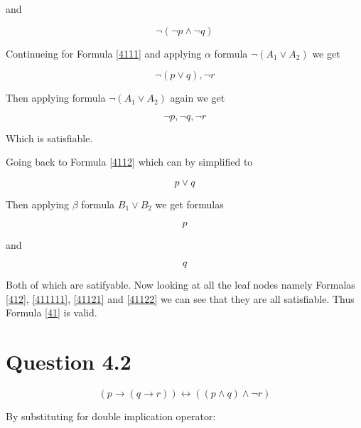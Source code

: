 \documentclass[10pt,a4paper]{article}
\begin{document}
 and 
 
 \begin{equation}
 \label{4112}
  \neg ( \neg p \wedge \neg q )
 \end{equation}


Continueing for Formula \ref{4111} and applying $\alpha$ formula $\neg ( A_1 \vee A_2 )$ we get

\begin{equation}
\label{41111}
 \neg (p \vee q), \neg r 
\end{equation}

Then applying formula $\neg ( A_1 \vee A_2 )$ again we get

\begin{equation}
\label{411111}
 \neg p, \neg q, \neg r
\end{equation}

Which is satisfiable.

Going back to Formula \ref{4112} which can by simplified to 

\begin{equation}
 p \vee q
\end{equation}

Then applying $\beta$ formula $B_1 \vee B_2$ we get formulas

\begin{equation}
 \label{41121}
 p
\end{equation}

and 

\begin{equation}
\label{41122}
q
\end{equation}

Both of which are satifyable. Now looking at all the leaf nodes namely 
Formalas \ref{412}, \ref{411111}, \ref{41121} and \ref{41122} we can see that they are all satisfiable. Thus
Formula \ref{41} is valid.







\section{Question 4.2}

\begin{equation}
\label{420}
(p \rightarrow ( q \rightarrow r )) \leftrightarrow (( p \wedge q) \wedge \neg r) 
\end{equation}

By substituting for double implication operator:
\end{document}
